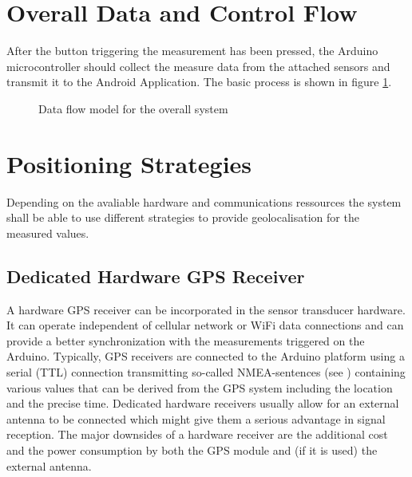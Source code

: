 \section{Overall Data and Control Flow}
\label{sec:data_flow}
After the button triggering the measurement has been pressed, the Arduino microcontroller should collect the measure data from the attached sensors and transmit it to the Android Application. The basic process is shown in figure \ref{fig:data_flow}.

\begin{center}
\begin{figure}[h]
\centering
{}
\caption{Data flow model for the overall system}
\label{fig:data_flow}
\end{figure}
\end{center}

\section{Positioning Strategies}
\label{sec:location}
Depending on the avaliable hardware and communications ressources the system shall be able to use different strategies to provide geolocalisation for the measured values. 

\subsection{Dedicated Hardware GPS Receiver}
A hardware GPS receiver can be incorporated in the sensor transducer hardware. It can operate independent of cellular network or WiFi data connections and can provide a better synchronization with the measurements triggered on the Arduino. Typically, GPS receivers are connected to the Arduino platform using a serial (TTL) connection transmitting so-called NMEA-sentences (see \cite{NMEASentences}) containing various values that can be derived from the GPS system including the location and the precise time. Dedicated hardware receivers usually allow for an external antenna to be connected which might give them a serious advantage in signal reception. The major downsides of a hardware receiver are the additional cost and the power consumption by both the GPS module and (if it is used) the external antenna.

